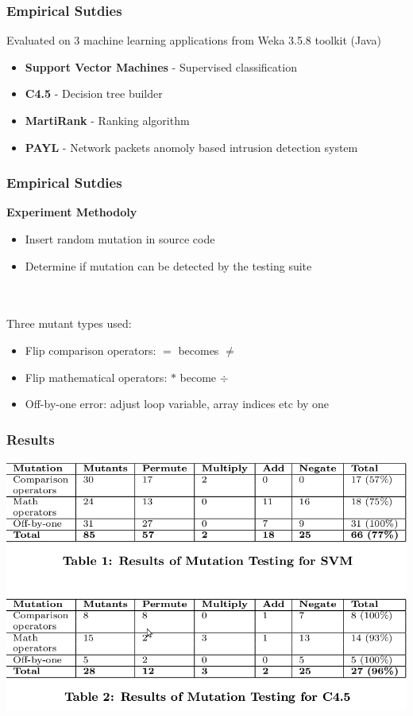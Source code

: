 \documentclass[compress,red]{beamer}
\begin{document}
\frame
{
	\frametitle{Empirical Sutdies}
	Evaluated on 3 machine learning applications from Weka 3.5.8 toolkit (Java)
	\begin{itemize}
		\item \textbf{Support Vector Machines} - Supervised classification
		\item \textbf{C4.5} - Decision tree builder
		\item \textbf{MartiRank} - Ranking algorithm
		\item \textbf{PAYL} - Network packets anomoly based intrusion detection system
	\end{itemize}

}

\frame
{
	\frametitle{Empirical Sutdies}
	\textbf{Experiment Methodoly}
	\begin{itemize}
		\item Insert random mutation in source code
		\item Determine if mutation can be detected by the testing suite
	\end{itemize}
\ \\ \ \\ 	
	Three mutant types used:
	\begin{itemize}
		\item Flip comparison operators: $=$  becomes $\neq$
		\item Flip mathematical operators: $*$ become $\div$
		\item Off-by-one error: adjust loop variable, array indices etc by one
	\end{itemize}

}

\frame
{
	\frametitle{Results}
	\begin{center}
	\includegraphics[scale=0.3]{amst-table1.png}
	\end{center}

}
\end{document}
